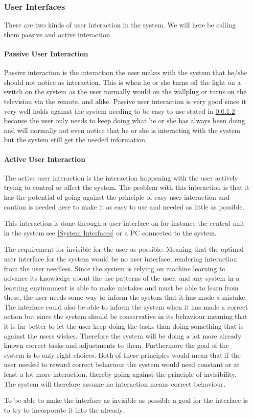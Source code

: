 \subsubsection{User Interfaces}
There are two kinds of user interaction in the system. We will here be calling them passive and active interaction.

\paragraph{Passive User Interaction}
Passive interaction is the interaction the user makes with the system that he/she should not notice as interaction. This is when he or she turns off the light on a switch on the system as the user normally would on the wallplug or turns on the television via the remote, and alike. Passive user interaction is very good since it very well holds against the system needing to be easy to use stated in \cref{} because the user only needs to keep doing what he or she has always been doing and will normally not even notice that he or she is interacting with the system but the system still get the needed information.

\paragraph{Active User Interaction}
The active user interaction is the interaction happening with the user actively trying to control or affect the system. The problem with this interaction is that it has the potential of going against the principle of easy user interaction and caution is needed here to make it as easy to use and needed as little as possible.

\paragrath{}

This interaction is done through a user interface on for instance the central unit in the system see \cref{System Interfaces} or a PC connected to the system.


The requirement for invisible for the user as possible. Meaning that the optimal user interface for the system would be no user interface, rendering  interaction from the user needless. Since the system is relying on machine learning to advance its knowledge about the use patterns of the user, and any system in a learning environment is able to make mistakes and must be able to learn from these, the user needs some way to inform the system that it has made a mistake. The interface could also be able to inform the system when it has made a correct action but since the system should be conservative in its behaviour meaning that it is far better to let the user keep doing the tasks than doing something that is against the users wishes. Therefore the system will be doing a lot more already known correct tasks and adjustments to them. Furthermore the goal of the system is to only right choices. Both of these principles would mean that if the user needed to reward correct behaviour the system would need constant or at least a lot more interaction, thereby going against the principle of invisibility. The system will therefore assume no interaction means correct behaviour.
 
To be able to make the interface as invisible as possible a goal for the interface is to try to incorporate it into the already.
